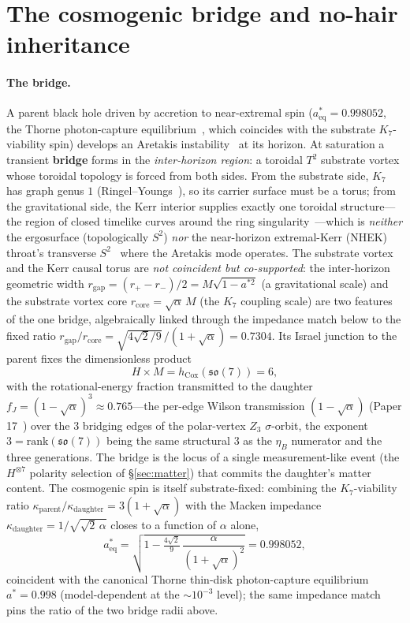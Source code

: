 \documentclass[11pt]{article}
\newcommand{\so}{\mathfrak{so}}
\newcommand{\hcox}{h_{\mathrm{Cox}}}
\begin{document}
\section{The cosmogenic bridge and no-hair inheritance}
\label{sec:bridge}

\paragraph{The bridge.} A parent black hole driven by accretion to near-extremal spin ($a^*_{\mathrm{eq}} = 0.998052$, the Thorne photon-capture equilibrium~\cite{Thorne1974}, which coincides with the substrate $K_7$-viability spin) develops an Aretakis instability~\cite{Aretakis} at its horizon. At saturation a transient \textbf{bridge} forms in the \emph{inter-horizon region}: a toroidal $T^2$ substrate vortex whose toroidal topology is forced from both sides. From the substrate side, $K_7$ has graph genus $1$ (Ringel--Youngs~\cite{RingelYoungs}), so its carrier surface must be a torus; from the gravitational side, the Kerr interior supplies exactly one toroidal structure---the region of closed timelike curves around the ring singularity~\cite{Carter1968}---which is \emph{neither} the ergosurface (topologically $S^2$) \emph{nor} the near-horizon extremal-Kerr (NHEK) throat's transverse $S^2$~\cite{BardeenHorowitz} where the Aretakis mode operates. The substrate vortex and the Kerr causal torus are \emph{not coincident but co-supported}: the inter-horizon geometric width $r_{\mathrm{gap}} = (r_+ - r_-)/2 = M\sqrt{1 - a^{*2}}$ (a gravitational scale) and the substrate vortex core $r_{\mathrm{core}} = \sqrt{\alpha}\,M$ (the $K_7$ coupling scale) are two features of the one bridge, algebraically linked through the impedance match below to the fixed ratio $r_{\mathrm{gap}}/r_{\mathrm{core}} = \sqrt{4\sqrt{2}/9}\,/(1+\sqrt{\alpha}) = 0.7304$. Its Israel junction to the parent fixes the dimensionless product
\[ H \times M = \hcox(\so(7)) = 6, \]
with the rotational-energy fraction transmitted to the daughter $f_J = (1 - \sqrt{\alpha})^3 \approx 0.765$---the per-edge Wilson transmission $(1 - \sqrt{\alpha})$ (Paper 17~\cite{Paper17}) over the $3$ bridging edges of the polar-vertex $Z_3$ $\sigma$-orbit, the exponent $3 = \mathrm{rank}(\so(7))$ being the same structural $3$ as the $\eta_B$ numerator and the three generations. The bridge is the locus of a single measurement-like event (the $H^{\otimes 7}$ polarity selection of \S\ref{sec:matter}) that commits the daughter's matter content. The cosmogenic spin is itself substrate-fixed: combining the $K_7$-viability ratio $\kappa_{\mathrm{parent}}/\kappa_{\mathrm{daughter}} = 3(1+\sqrt{\alpha})$ with the Macken impedance $\kappa_{\mathrm{daughter}} = 1/\sqrt{\sqrt{2}\,\alpha}$ closes to a function of $\alpha$ alone,
\[ a^*_{\mathrm{eq}} = \sqrt{1 - \tfrac{4\sqrt{2}}{9}\,\frac{\alpha}{(1+\sqrt{\alpha})^2}} = 0.998052, \]
coincident with the canonical Thorne thin-disk photon-capture equilibrium $a^* = 0.998$ (model-dependent at the $\sim\!10^{-3}$ level); the same impedance match pins the ratio of the two bridge radii above.
\end{document}
